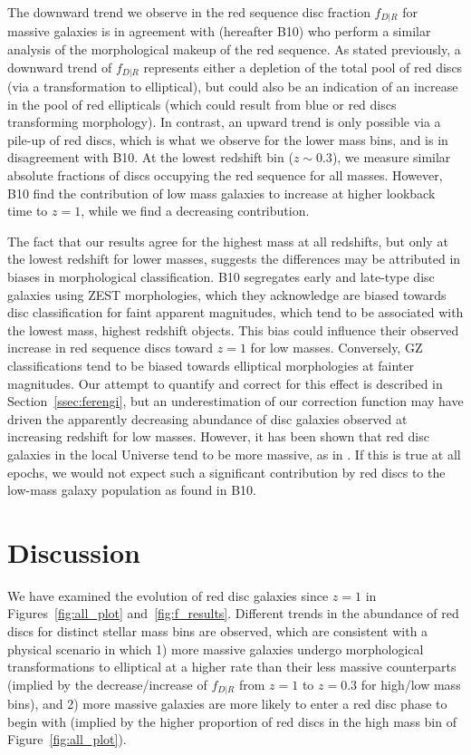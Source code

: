 \documentclass[useAMS,usenatbib]{mn2e}
\begin{document}
The downward trend we observe in the red sequence disc fraction $f_{D|R}$ for massive galaxies is in agreement with \citet{Bundy2010} (hereafter B10) who perform a similar analysis of the morphological makeup of the red sequence. As stated previously, a downward trend of $f_{D|R}$ represents either a depletion of the total pool of red discs (via a transformation to elliptical), but could also be an indication of an increase in the pool of red ellipticals (which could result from blue or red discs transforming morphology). In contrast, an upward trend is only possible via a pile-up of red discs, which is what we observe for the lower mass bins, and is in disagreement with B10. At the lowest redshift bin ($z\sim0.3$), we measure similar absolute fractions of discs occupying the red sequence for all masses. However, B10 find the contribution of low mass galaxies to increase at higher lookback time to $z=1$, while we find a decreasing contribution. 

The fact that our results agree for the highest mass at all redshifts, but only at the lowest redshift for lower masses, suggests the differences may be attributed in biases in morphological classification. B10 segregates early and late-type disc galaxies using ZEST \citep{Scarlata2007} morphologies, which they acknowledge are biased towards disc classification for faint apparent magnitudes, which tend to be associated with the lowest mass, highest redshift objects. This bias could influence their observed increase in red sequence discs toward $z=1$ for low masses. Conversely, GZ classifications tend to be biased towards elliptical morphologies at fainter magnitudes. Our attempt to quantify and correct for this effect is described in Section~\ref{ssec:ferengi}, but an underestimation of our correction function may have driven the apparently decreasing abundance of disc galaxies observed at increasing redshift for low masses. However, it has been shown that red disc galaxies in the local Universe tend to be more massive, as in \citet{Masters2010}. If this is true at all epochs, we would not expect such a significant contribution by red discs to the low-mass galaxy population as found in B10.

\section{Discussion}
\label{sec:discussion}
We have examined the evolution of red disc galaxies since $z=1$ in Figures~\ref{fig:all_plot} and~\ref{fig:f_results}. Different trends in the abundance of red discs for distinct stellar mass bins are observed, which are consistent with a physical scenario in which 1) more massive galaxies undergo morphological transformations to elliptical at a higher rate than their less massive counterparts (implied by the decrease/increase of $f_{D|R}$ from $z=1$ to $z=0.3$ for high/low mass bins), and 2) more massive galaxies are more likely to enter a red disc phase to begin with (implied by the higher proportion of red discs in the high mass bin of Figure~\ref{fig:all_plot}). 
\end{document}
